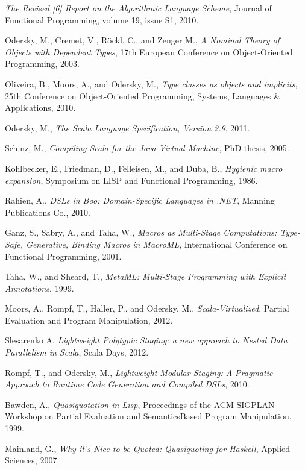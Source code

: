 \documentclass{llncs}
\begin{document}
\begin{thebibliography}{99}
  \emph{The Revised [6] Report on the Algorithmic Language Scheme},
  Journal of Functional Programming, volume 19, issue S1,
  2010.

  Odersky, M., Cremet, V., Röckl, C., and Zenger M.,
  \emph{A Nominal Theory of Objects with Dependent Types},
  17th European Conference on Object-Oriented Programming,
  2003.

  Oliveira, B., Moors, A., and Odersky, M.,
  \emph{Type classes as objects and implicits},
  25th Conference on Object-Oriented Programming, Systems, Languages \& Applications,
  2010.

  Odersky, M.,
  \emph{The Scala Language Specification, Version 2.9},
  2011.

  Schinz, M.,
  \emph{Compiling Scala for the Java Virtual Machine},
  PhD thesis,
  2005.

  Kohlbecker, E., Friedman, D., Felleisen, M., and Duba, B.,
  \emph{Hygienic macro expansion},
  Symposium on LISP and Functional Programming,
  1986.

  Rahien, A.,
  \emph{DSLs in Boo: Domain-Specific Languages in .NET},
  Manning Publications Co.,
  2010.

  Ganz, S., Sabry, A., and Taha, W.,
  \emph{Macros as Multi-Stage Computations: Type-Safe, Generative, Binding Macros in MacroML},
  International Conference on Functional Programming,
  2001.

  Taha, W., and Sheard, T.,
  \emph{MetaML: Multi-Stage Programming with Explicit Annotations},
  1999.

  Moors, A., Rompf, T., Haller, P., and Odersky, M.,
  \emph{Scala-Virtualized},
  Partial Evaluation and Program Manipulation,
  2012.

  Slesarenko A,
  \emph{Lightweight Polytypic Staging: a new approach to Nested Data Parallelism in Scala},
  Scala Days,
  2012.

  Rompf, T., and Odersky, M.,
  \emph{Lightweight Modular Staging: A Pragmatic Approach to Runtime Code Generation and Compiled DSLs},
  2010.

  Bawden, A.,
  \emph{Quasiquotation in Lisp},
  Proceedings of the ACM SIGPLAN Workshop on Partial Evaluation and SemanticsBased Program Manipulation,
  1999.

  Mainland, G.,
  \emph{Why it's Nice to be Quoted: Quasiquoting for Haskell},
  Applied Sciences,
  2007.

\end{thebibliography}
\end{document}
